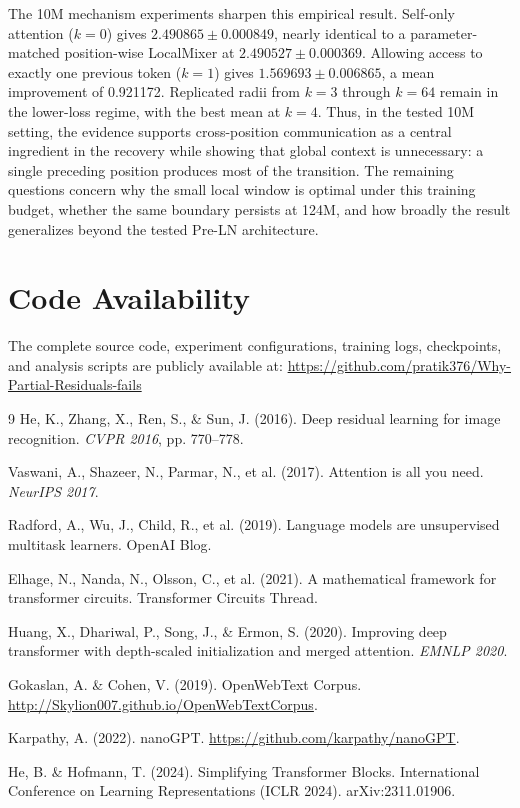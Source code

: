 \documentclass[11pt]{article}
\begin{document}
The 10M mechanism experiments sharpen this empirical result. Self-only attention ($k=0$) gives $2.490865 \pm 0.000849$, nearly identical to a parameter-matched position-wise LocalMixer at $2.490527 \pm 0.000369$. Allowing access to exactly one previous token ($k=1$) gives $1.569693 \pm 0.006865$, a mean improvement of 0.921172. Replicated radii from $k=3$ through $k=64$ remain in the lower-loss regime, with the best mean at $k=4$. Thus, in the tested 10M setting, the evidence supports cross-position communication as a central ingredient in the recovery while showing that global context is unnecessary: a single preceding position produces most of the transition. The remaining questions concern why the small local window is optimal under this training budget, whether the same boundary persists at 124M, and how broadly the result generalizes beyond the tested Pre-LN architecture.

\section*{Code Availability}
The complete source code, experiment configurations, training logs, checkpoints, and analysis scripts are publicly available at: \url{https://github.com/pratik376/Why-Partial-Residuals-fails}

\begin{thebibliography}{9}
He, K., Zhang, X., Ren, S., \& Sun, J. (2016). Deep residual learning for image recognition. \emph{CVPR 2016}, pp. 770--778.

Vaswani, A., Shazeer, N., Parmar, N., et al. (2017). Attention is all you need. \emph{NeurIPS 2017}.

Radford, A., Wu, J., Child, R., et al. (2019). Language models are unsupervised multitask learners. OpenAI Blog.

Elhage, N., Nanda, N., Olsson, C., et al. (2021). A mathematical framework for transformer circuits. Transformer Circuits Thread.

Huang, X., Dhariwal, P., Song, J., \& Ermon, S. (2020). Improving deep transformer with depth-scaled initialization and merged attention. \emph{EMNLP 2020}.

Gokaslan, A. \& Cohen, V. (2019). OpenWebText Corpus. \url{http://Skylion007.github.io/OpenWebTextCorpus}.

Karpathy, A. (2022). nanoGPT. \url{https://github.com/karpathy/nanoGPT}.

He, B. \& Hofmann, T. (2024). Simplifying Transformer Blocks. International Conference on Learning Representations (ICLR 2024). arXiv:2311.01906.
\end{thebibliography}
\end{document}
